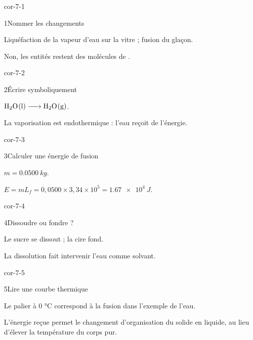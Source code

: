 \clearpage{}
\corrigesSouples
\begin{blocLivre}{cor-7-1}\begin{corrige}{1}{Nommer les changements}
\begin{questions}
\item Liquéfaction de la vapeur d’eau sur la vitre ; fusion du glaçon.
\item Non, les entités restent des molécules de .
\end{questions}
\end{corrige}\end{blocLivre}
\begin{blocLivre}{cor-7-2}\begin{corrige}{2}{Écrire symboliquement}
\begin{questions}
\item $\ce{H2O(l) -> H2O(g)}$.
\item La vaporisation est endothermique : l’eau reçoit de l’énergie.
\end{questions}
\end{corrige}\end{blocLivre}
\begin{blocLivre}{cor-7-3}\begin{corrige}{3}{Calculer une énergie de fusion}
\begin{questions}
\item $m=\qty{0,0500}{kg}$.
\item $E=mL_f=0,0500\times3,34\times10^5=\qty{1,67e4}{J}$.
\end{questions}
\end{corrige}\end{blocLivre}
\begin{blocLivre}{cor-7-4}\begin{corrige}{4}{Dissoudre ou fondre ?}
\begin{questions}
\item Le sucre se dissout ; la cire fond.
\item La dissolution fait intervenir l’eau comme solvant.
\end{questions}
\end{corrige}\end{blocLivre}
\begin{blocLivre}{cor-7-5}\begin{corrige}{5}{Lire une courbe thermique}
\begin{questions}
\item Le palier à 0 °C correspond à la fusion dans l’exemple de l’eau.
\item L’énergie reçue permet le changement d’organisation du solide en liquide, au lieu d’élever la température du corps pur.
\end{questions}
\end{corrige}\end{blocLivre}
